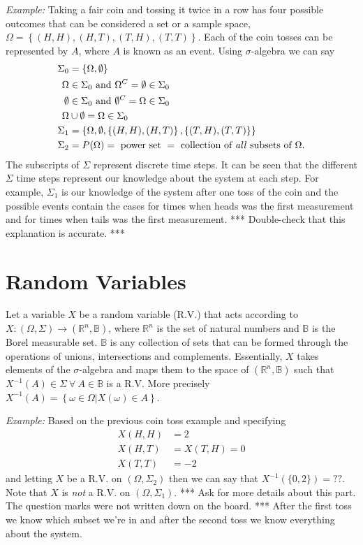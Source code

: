 \documentclass[lecture,12pt,]{pcms-l}
\begin{document}
\textit{Example:} Taking a fair coin and tossing it twice in a row has four possible outcomes that can be considered a set or a sample space, $\Omega = \left\lbrace (H,H), (H,T), (T,H), (T,T) \right\rbrace$. Each of the coin tosses can be represented by $A$, where $A$ is known as an event. Using $\sigma$-algebra we can say
\begin{align*}
\Sigma_0 &= \left\lbrace \Omega, \emptyset \right\rbrace \\
\Omega &\in \Sigma_0 \textnormal{ and } \Omega^C = \emptyset \in \Sigma_0 \\
\emptyset &\in \Sigma_0 \textnormal{ and } \emptyset^C = \Omega \in \Sigma_0 \\
\Omega &\cup \emptyset = \Omega \in \Sigma_0 \\
\Sigma_1 &= \left\lbrace \Omega, \emptyset, \left\lbrace (H,H), (H,T) \right\rbrace, \left\lbrace (T,H), (T,T) \right\rbrace \right\rbrace \\
\Sigma_2 &= P(\Omega) = \textnormal{ power set } = \textnormal{ collection of \textit{all} subsets of } \Omega.
\end{align*}
The subscripts of $\Sigma$ represent discrete time steps. It can be seen that the different $\Sigma$ time steps represent our knowledge about the system at each step. For example, $\Sigma_1$ is our knowledge of the system after one toss of the coin and the possible events contain the cases for times when heads was the first measurement and for times when tails was the first measurement. *** Double-check that this explanation is accurate. ***

\section{Random Variables}
Let a variable $X$ be a random variable (R.V.) that acts according to \\
$X: (\Omega, \Sigma) \to (\mathbb{R}^n, \mathbb{B})$, where $\mathbb{R}^n$ is the set of natural numbers and $\mathbb{B}$ is the Borel measurable set. $\mathbb{B}$ is any collection of sets that can be formed through the operations of unions, intersections and complements. Essentially, $X$ takes elements of the $\sigma$-algebra and maps them to the space of $(\mathbb{R}^n, \mathbb{B})$ such that $X^{-1}(A) \in \Sigma ~ \forall ~ A \in \mathbb{B}$ is a R.V. More precisely $X^{-1}(A) = \left\lbrace \omega \in \Omega | X(\omega) \in A \right\rbrace$.

\textit{Example:} Based on the previous coin toss example and specifying
\begin{align*}
X(H,H) &= 2 \\
X(H,T) &= X(T,H) = 0 \\
X(T,T) &= -2
\end{align*}
and letting $X$ be a R.V. on $(\Omega, \Sigma_2)$ then we can say that $X^{-1}(\lbrace 0,2 \rbrace) = ??$. Note that $X$ is \textit{not} a R.V. on $(\Omega, \Sigma_1)$. *** Ask for more details about this part. The question marks were not written down on the board. *** After the first toss we know which subset  we're in and after the second toss we know everything about the system.
\end{document}
